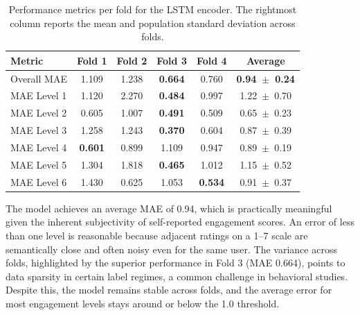 \documentclass[review]{vgtc}                 %
\begin{document}
\begin{table}[h]
    \centering
    \caption{Performance metrics per fold for the LSTM encoder. The rightmost column reports the mean and population standard deviation across folds.}
    \label{tab:lstm_cv}
    \setlength{\tabcolsep}{4pt}
    \begin{tabular}{lccccc}
        \hline
        \textbf{Metric} & \textbf{Fold 1} & \textbf{Fold 2} & \textbf{Fold 3} & \textbf{Fold 4} & \textbf{Average} \\
        \hline
        Overall MAE & 1.109 & 1.238 & \textbf{0.664} & 0.760 & \textbf{0.94~$\pm$~0.24} \\
        MAE Level 1 & 1.120 & 2.270 & \textbf{0.484} & 0.997 & 1.22~$\pm$~0.70 \\
        MAE Level 2 & 0.605 & 1.007 & \textbf{0.491} & 0.509 & 0.65~$\pm$~0.23 \\
        MAE Level 3 & 1.258 & 1.243 & \textbf{0.370} & 0.604 & 0.87~$\pm$~0.39 \\
        MAE Level 4 & \textbf{0.601} & 0.899 & 1.109 & 0.947 & 0.89~$\pm$~0.19 \\
        MAE Level 5 & 1.304 & 1.818 & \textbf{0.465} & 1.012 & 1.15~$\pm$~0.52 \\
        MAE Level 6 & 1.430 & 0.625 & 1.053 & \textbf{0.534} & 0.91~$\pm$~0.37 \\
        \hline
    \end{tabular}
\end{table}

The model achieves an average MAE of 0.94, which is practically meaningful given the inherent subjectivity of self-reported engagement scores. An error of less than one level is reasonable because adjacent ratings on a 1--7 scale are semantically close and often noisy even for the same user. The variance across folds, highlighted by the superior performance in Fold 3 (MAE 0.664), points to data sparsity in certain label regimes, a common challenge in behavioral studies. Despite this, the model remains stable across folds, and the average error for most engagement levels stays around or below the 1.0 threshold.
\end{document}
